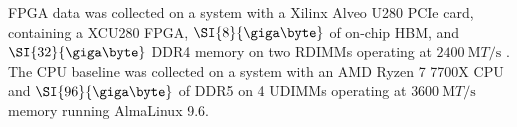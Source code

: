
FPGA data was collected on a system with a Xilinx Alveo U280 PCIe card,
containing a XCU280 FPGA, $\SI{8}{\giga\byte}$ of on-chip HBM, and
$\SI{32}{\giga\byte}$ DDR4 memory on two RDIMMs operating at
$\SI{2400}{\mega{T}\per\second}$ \autocite{u280}. The CPU baseline was collected
on a system with an AMD Ryzen 7 7700X CPU and $\SI{96}{\giga\byte}$ of DDR5 on 4
UDIMMs operating at $\SI{3600}{\mega{T}\per\second}$ memory running AlmaLinux
9.6.
